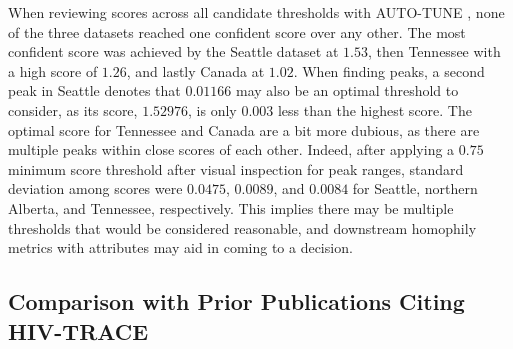 \documentclass[utf8]{FrontiersinHarvard} %
\begin{document}


When reviewing scores across all candidate thresholds with AUTO-TUNE
\label{fig:clustuner}, none of the three datasets reached one confident score
over any other. The most confident score was achieved by the Seattle dataset at
$1.53$, then Tennessee with a high score of $1.26$, and lastly Canada at
$1.02$. When finding peaks, a second peak in Seattle denotes that $0.01166$ may
also be an optimal threshold to consider, as its score, $1.52976$, is only
$0.003$ less than the highest score. The optimal score for Tennessee and Canada
are a bit more dubious, as there are multiple peaks within close scores of each
other. Indeed, after applying a $0.75$ minimum score threshold after visual
inspection for peak ranges, standard deviation among scores were $0.0475$,
$0.0089$, and $0.0084$ for Seattle, northern Alberta, and Tennessee,
respectively. This implies there may be multiple thresholds that would be
considered reasonable, and downstream homophily metrics with attributes may aid
in coming to a decision.

\subsection{Comparison with Prior Publications Citing HIV-TRACE}

\end{document}
